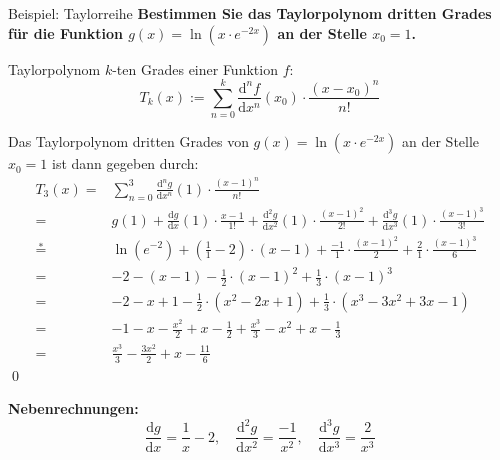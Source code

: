 \documentclass[german]{spicker}
\begin{document}
\begin{bonus}{Beispiel: Taylorreihe}
    \textbf{Bestimmen Sie das Taylorpolynom dritten Grades für die Funktion $g(x) = \ln(x\cdot e^{-2x})$ an der Stelle $x_0 = 1$.}

    Taylorpolynom $k$-ten Grades einer Funktion $f$:
    $$T_k(x) := \sum_{n=0}^k \frac{\mathrm{d}^n f}{\mathrm{d}x^n} (x_0)\cdot\frac{(x-x_0)^n}{n!} $$

    Das Taylorpolynom dritten Grades von $g(x) = \ln(x\cdot e^{-2x})$ an der Stelle $x_0 = 1$ ist dann gegeben durch:
    $$
        \begin{aligned}
            T_3(x) ={}      & \sum_{n=0}^3 \frac{\mathrm{d}^n g}{\mathrm{d}x^n} (1)\cdot\frac{(x-1)^n}{n!}                                                                                                                       \\
            ={}             & g(1) + \frac{\mathrm{d} g}{\mathrm{d} x}(1)\cdot\frac{x-1}{1!} + \frac{\mathrm{d^2} g}{\mathrm{d} x^2}(1)\cdot\frac{(x-1)^2}{2!} + \frac{\mathrm{d^3} g}{\mathrm{d} x^3}(1)\cdot\frac{(x-1)^3}{3!} \\
            \stackrel{*}={} & \ln(e^{-2}) + \left( \frac{1}{1}- 2 \right)\cdot(x-1) + \frac{-1}{1}\cdot\frac{(x-1)^2}{2} + \frac{2}{1}\cdot\frac{(x-1)^3}{6}                                                                     \\
            ={}             & -2 -(x-1) - \frac{1}{2}\cdot (x-1)^2 +\frac{1}{3}\cdot (x-1)^3                                                                                                                                     \\
            ={}             & -2 -x+1 - \frac{1}{2}\cdot (x^2-2x+1) +\frac{1}{3}\cdot (x^3 -3x^2+3x-1)                                                                                                                           \\
            ={}             & -1 -x - \frac{x^2}{2} + x -\frac{1}{2} +\frac{x^3}{3} - x^2 + x -\frac{1}{3}                                                                                                                       \\
            ={}             & \frac{x^3}{3}- \frac{3x^2}{2} + x - \frac{11}{6}
        \end{aligned}
    $$
    \qed

    \vspace{2em}

    \textbf{Nebenrechnungen:}
    $$
        \frac{\mathrm{d} g}{\mathrm{d} x} = \frac{1}{x} - 2, \quad
        \frac{\mathrm{d}^2 g}{\mathrm{d} x^2} = \frac{-1}{x^2}, \quad
        \frac{\mathrm{d}^3 g}{\mathrm{d} x^3} = \frac{2}{x^3}
    $$
\end{bonus}
\end{document}
